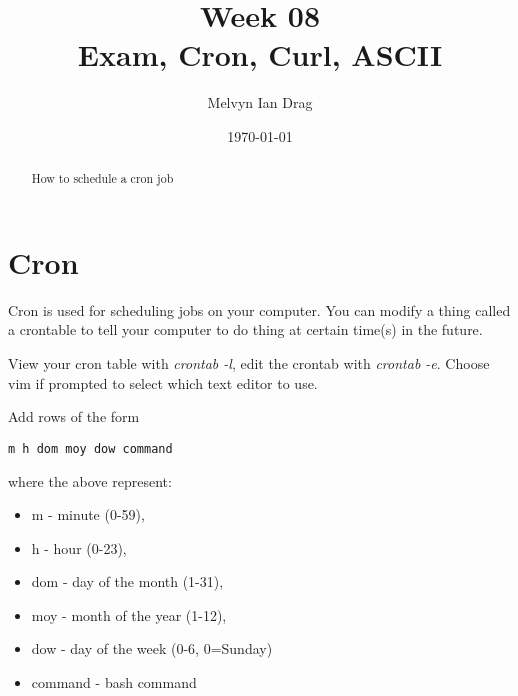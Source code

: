 \documentclass[12pt]{article}
\title{\textbf{Week 08} \\
\Large Exam, Cron, Curl, ASCII}
\author{
	Melvyn Ian Drag
}
\date{\today}
\begin{document}
\maketitle

\begin{abstract}
How to schedule a cron job
\end{abstract}


\section{Cron}
Cron is used for scheduling jobs on your computer. You can modify a thing called a crontable to tell your computer to do thing at certain time(s) in the future.

View your cron table with \textit{crontab -l}, edit the crontab with \textit{crontab -e}. Choose vim if prompted to  select which text editor to use.

Add rows of the form
\begin{lstlisting}
m h dom moy dow command
\end{lstlisting}

where the above represent:

\begin{itemize}
\item m - minute (0-59),
\item h - hour (0-23),
\item dom - day of the month (1-31),
\item moy - month of the year (1-12),
\item dow - day of the week (0-6, 0=Sunday)
\item command - bash command
\end{itemize}
\end{document}
